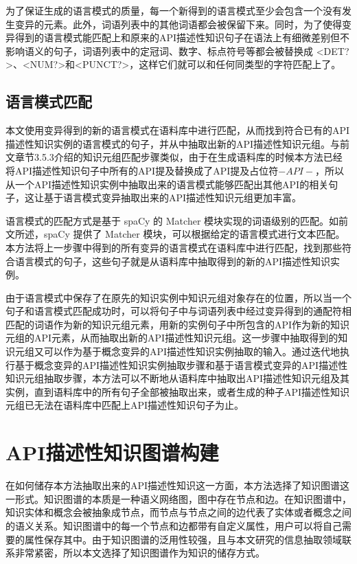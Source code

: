 为了保证生成的语言模式的质量，每一个新得到的语言模式至少会包含一个没有发生变异的元素。此外，词语列表中的其他词语都会被保留下来。同时，为了使得变异得到的语言模式能匹配上和原来的API描述性知识句子在语法上有细微差别但不影响语义的句子，词语列表中的定冠词、数字、标点符号等都会被替换成 <DET?>、<NUM?>和<PUNCT?>，这样它们就可以和任何同类型的字符匹配上了。

\subsection{语言模式匹配}
本文使用变异得到的新的语言模式在语料库中进行匹配，从而找到符合已有的API描述性知识实例的语言模式的句子，并从中抽取出新的API描述性知识元组。与前文章节3.5.3介绍的知识元组匹配步骤类似，由于在生成语料库的时候本方法已经将API描述性知识句子中所有的API提及替换成了API提及占位符$-API-$，所以从一个API描述性知识实例中抽取出来的语言模式能够匹配出其他API的相关句子，这让基于语言模式变异抽取出来的API描述性知识元组更加丰富。

语言模式的匹配方式是基于 spaCy 的 Matcher 模块实现的词语级别的匹配。如前文所述，spaCy 提供了 Matcher 模块，可以根据给定的语言模式进行文本匹配。本方法将上一步骤中得到的所有变异的语言模式在语料库中进行匹配，找到那些符合语言模式的句子，这些句子就是从语料库中抽取得到的新的API描述性知识实例。

由于语言模式中保存了在原先的知识实例中知识元组对象存在的位置，所以当一个句子和语言模式匹配成功时，可以将句子中与词语列表中经过变异得到的通配符相匹配的词语作为新的知识元组元素，用新的实例句子中所包含的API作为新的知识元组的API元素，从而抽取出新的API描述性知识元组。这一步骤中抽取得到的知识元组又可以作为基于概念变异的API描述性知识实例抽取的输入。通过迭代地执行基于概念变异的API描述性知识实例抽取步骤和基于语言模式变异的API描述性知识元组抽取步骤，本方法可以不断地从语料库中抽取出API描述性知识元组及其实例，直到语料库中的所有句子全部被抽取出来，或者生成的种子API描述性知识元组已无法在语料库中匹配上API描述性知识句子为止。

\section{API描述性知识图谱构建}
在如何储存本方法抽取出来的API描述性知识这一方面，本方法选择了知识图谱这一形式。知识图谱的本质是一种语义网络图，图中存在节点和边。在知识图谱中，知识实体和概念会被抽象成节点，而节点与节点之间的边代表了实体或者概念之间的语义关系。知识图谱中的每一个节点和边都带有自定义属性，用户可以将自己需要的属性保存其中。由于知识图谱的泛用性较强，且与本文研究的信息抽取领域联系非常紧密，所以本文选择了知识图谱作为知识的储存方式。

